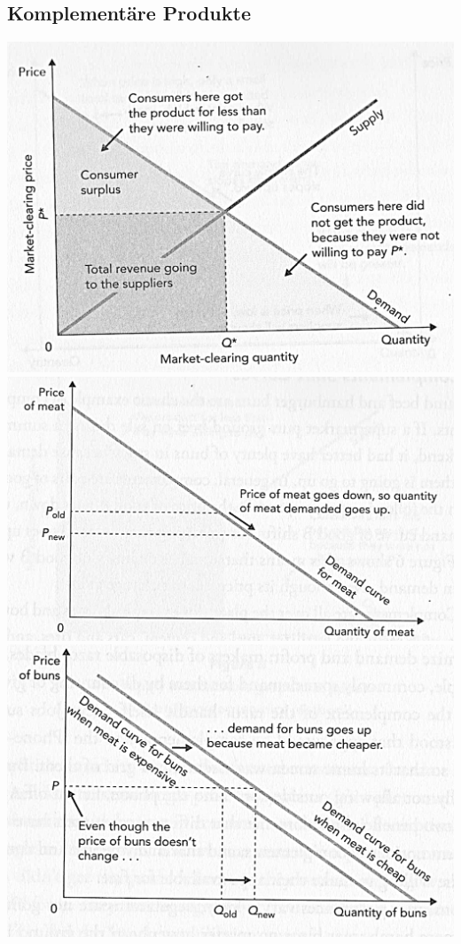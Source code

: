 \subsection{Komplementäre Produkte}
\begin{multicols}{3}
	\includegraphics[width=1\linewidth]{images/komp_produkte_1}
	\includegraphics[width=1\linewidth]{images/komp_produkte_2}
	\includegraphics[width=1\linewidth]{images/komp_produkte_3}
\end{multicols}

